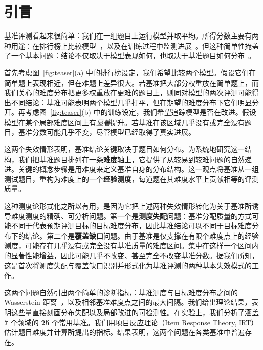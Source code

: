 \section{引言}

基准评测看起来很简单：我们在一组题目上运行模型并取平均。所得分数主要有两种用途：在排行榜上比较模型~\citep{alzahrani2024benchmarks,wang2018glue,liang2022holistic,myrzakhan2024open}，以及在训练过程中监测进展~\citep{liu2025prorl,hu2025open,he2025skywork,bercovich2025llama,luo2025deepscaler}。但这种简单性掩盖了一个基本问题：结论不仅取决于模型表现如何，也取决于基准题目如何分布~\cite{siska2024examining,zhang2026rankllm}。


首先考虑图~\ref{fig:teaser}(a) 中的排行榜设定，我们希望比较两个模型。假设它们在简单题上表现相近，但在难题上差异很大。若基准把大部分权重放在简单题上，而我们关心的难度分布把更多权重放在更难的题目上，则同对模型的两次评测可能得出不同结论：基准可能表明两个模型几乎打平，但在期望的难度分布下它们明显分开。再考虑图~\ref{fig:teaser}(b) 中的训练设定，我们希望追踪模型是否在改进。假设模型在某个局部难度区间上有\textit{显著}提升。若基准在该区域几乎没有或完全没有题目，基准分数可能几乎不变，尽管模型已经取得了真实进展。

这两个失效情形表明，基准结论关键取决于题目如何分布。为系统地研究这一结构，我们把基准题目排列在一条\textbf{难度}轴上，它提供了从较易到较难问题的自然递进。关键的概念步骤是用难度来定义基准自身的分布结构。这一观点将基准从一组测试题目，重构为难度上的一个\textbf{经验测度}，每道题在其难度水平上贡献相等的评测质量。


这种测度论形式化之所以有用，是因为它把上述两种失效情形转化为关于基准所诱导难度测度的精确、可分析问题。第一个是\textbf{测度失配}问题：基准分配质量的方式可能不同于代表预期评测目标的目标难度分布，因此基准结论可以不同于目标难度分布下的结论。第二个是\textbf{覆盖缺口}问题。由于基准是仅支撑在有限个难度点上的经验测度，可能存在几乎没有或完全没有基准质量的难度区间。集中在这样一个区间内的显著性能增益，因此可能几乎不改变、甚至完全不改变基准分数。据我们所知，这是首次将测度失配与覆盖缺口识别并形式化为基准评测的两种基本失效模式的工作。

这两个问题自然引出两个简单的诊断指标：基准测度与目标难度分布之间的 Wasserstein 距离~\cite{villani2009optimal}，以及相邻基准难度点之间的最大间隔。我们给出理论结果，表明这些量直接刻画分布失配以及局部改进的可检测性。在实验上，我们分析了涵盖 \textbf{7} 个领域的 \textbf{25} 个常用基准。我们用项目反应理论（Item Response Theory, IRT）估计题目难度并计算所提出的指标。结果表明，这两个问题在各类基准中普遍存在。

